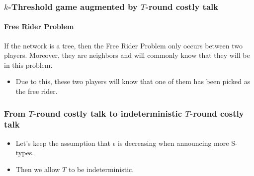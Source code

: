 \documentclass[9pt]{beamer}
\begin{document}
\begin{frame}
\frametitle{$k$-Threshold game augmented by $T$-round costly talk}
  \framesubtitle{Free Rider Problem}
  
\begin{lemma} If the network is a tree, then the Free Rider Problem only occurs between two players. Moreover, they are neighbors and will commonly know that they will be in this problem.
\end{lemma}  
\begin{itemize}
\item Due to this, these two players will know that one of them has been picked as the free rider. 
\end{itemize}
\end{frame}


\begin{frame}
\frametitle{From $T$-round costly talk to indeterministic $T$-round costly talk}
\begin{itemize}
\item Let's keep the assumption that $\epsilon$ \alert{is decreasing} when announcing \alert{more} S-types.
\item Then we allow $T$ to be indeterministic.
\end{itemize}
\end{frame}
\end{document}
